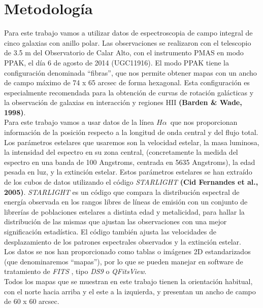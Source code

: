 \documentclass{article}
\newcommand{\hal}{$H\alpha$}
\begin{document}
\section{Metodología}
Para este trabajo vamos a utilizar datos de espectroscopia de campo integral de cinco galaxias con anillo polar. Las observaciones se realizaron con el telescopio de 3.5 m del Observatorio de Calar Alto, con el instrumento PMAS  en modo PPAK, el día 6 de agosto de 2014 (UGC11916). El modo PPAK tiene la configuración denominada ``fibras'', que nos permite obtener mapas con un ancho de campo máximo de 74 x 65 arcsec de forma hexagonal. Esta configuración es especialmente recomendada para la obtención de curvas de rotación galácticas y la observación de galaxias en interacción y regiones HII \textbf{(Barden & Wade, 1998)}.\\Para este trabajo vamos a usar datos de la línea \hal\ que nos proporcionan información de la posición respecto a la longitud de onda central y del flujo total. Los parámetros estelares que usaremos son la velocidad estelar, la masa luminosa, la intensidad del espectro en su zona central, (concretamente la medida del espectro en una banda de 100 Angstroms, centrada en 5635 Angstroms), la edad pesada en luz, y la extinción estelar. Estos parámetros estelares se han extraído de los cubos de datos utilizando el código \emph{STARLIGHT} \textbf{(Cid Fernandes et al., 2005)}. \emph{STARLIGHT} es un código que compara la distribución espectral de energía observada en los rangos libres de líneas de emisión con un conjunto de librerías de poblaciones estelares a distinta edad y metalicidad, para hallar la distribución de las mismas que ajustan las observaciones con una mejor significación estadística. El código también ajusta las velocidades de desplazamiento de los patrones espectrales observados y la extinción estelar.\\Los datos se nos han proporcionado como tablas o imágenes 2D estandarizados (que denominaremos ``mapas''), por lo que se pueden manejar en software de tratamiento de \emph{FITS} , tipo \emph{DS9} o \emph{QFitsView}.\\Todos los mapas que se muestran en este trabajo tienen la orientación habitual, con el norte hacia arriba y el este a la izquierda, y presentan un ancho de campo de 60 x 60 arcsec.
\end{document}
